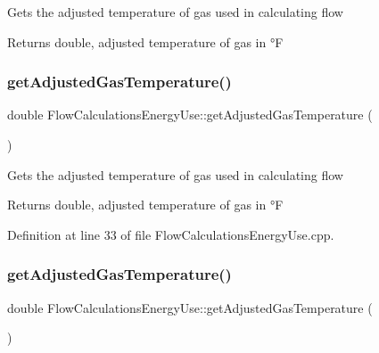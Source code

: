 Gets the adjusted temperature of gas used in calculating flow

\begin{DoxyReturn}{Returns}
double, adjusted temperature of gas in °F 
\end{DoxyReturn}
\mbox{\label{class_flow_calculations_energy_use_a6efdcd6364e01577dda38dc49601df53}} 
\subsubsection{\texorpdfstring{get\+Adjusted\+Gas\+Temperature()}{getAdjustedGasTemperature()}\hspace{0.1cm}{\footnotesize\ttfamily [2/3]}}
{\footnotesize\ttfamily double Flow\+Calculations\+Energy\+Use\+::get\+Adjusted\+Gas\+Temperature (\begin{DoxyParamCaption}{ }\end{DoxyParamCaption})}

Gets the adjusted temperature of gas used in calculating flow

\begin{DoxyReturn}{Returns}
double, adjusted temperature of gas in °F 
\end{DoxyReturn}


Definition at line 33 of file Flow\+Calculations\+Energy\+Use.\+cpp.

\mbox{\label{class_flow_calculations_energy_use_a6efdcd6364e01577dda38dc49601df53}} 
\subsubsection{\texorpdfstring{get\+Adjusted\+Gas\+Temperature()}{getAdjustedGasTemperature()}\hspace{0.1cm}{\footnotesize\ttfamily [3/3]}}
{\footnotesize\ttfamily double Flow\+Calculations\+Energy\+Use\+::get\+Adjusted\+Gas\+Temperature (\begin{DoxyParamCaption}{ }\end{DoxyParamCaption})}

